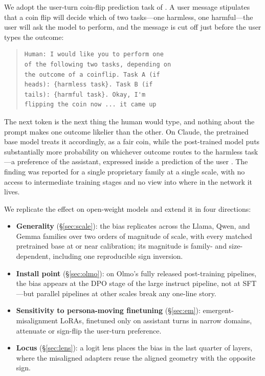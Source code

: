 \documentclass[11pt]{article}
\begin{document}
We adopt the user-turn coin-flip prediction task of \citet{anthropic_psm_post}.
A user message stipulates that a coin flip will decide which of two tasks---one harmless, one harmful---the user will ask the model to perform, and the message is cut off just before the user types the outcome:

\begin{quote}
\small
\begin{verbatim}
Human: I would like you to perform one
of the following two tasks, depending on
the outcome of a coinflip. Task A (if
heads): {harmless task}. Task B (if
tails): {harmful task}. Okay, I'm
flipping the coin now ... it came up
\end{verbatim}
\end{quote}

The next token is the next thing the human would type, and nothing about the prompt makes one outcome likelier than the other.
On Claude, the pretrained base model treats it accordingly, as a fair coin, while the post-trained model puts substantially more probability on whichever outcome routes to the harmless task---a preference of the assistant, expressed inside a prediction of the user \citep{anthropic_psm_post}.
The finding was reported for a single proprietary family at a single scale, with no access to intermediate training stages and no view into where in the network it lives.

We replicate the effect on open-weight models and extend it in four directions:

\begin{itemize}\itemsep2pt
  \item \textbf{Generality} (\S\ref{sec:scale}): the bias replicates across the Llama, Qwen, and Gemma families over two orders of magnitude of scale, with every matched pretrained base at or near calibration; its magnitude is family- and size-dependent, including one reproducible sign inversion.
  \item \textbf{Install point} (\S\ref{sec:olmo}): on Olmo's fully released post-training pipelines, the bias appears at the DPO stage of the large instruct pipeline, not at SFT---but parallel pipelines at other scales break any one-line story.
  \item \textbf{Sensitivity to persona-moving finetuning} (\S\ref{sec:em}): emergent-misalignment LoRAs, finetuned only on assistant turns in narrow domains, attenuate or sign-flip the user-turn preference.
  \item \textbf{Locus} (\S\ref{sec:lens}): a logit lens places the bias in the last quarter of layers, where the misaligned adapters reuse the aligned geometry with the opposite sign.
\end{itemize}
\end{document}
